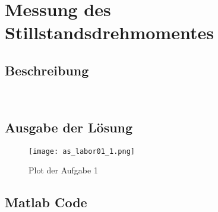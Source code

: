 \section{Messung des Stillstandsdrehmomentes}

\subsection{Beschreibung}
\lipsum[1]\\

\subsection{Ausgabe der Lösung}
\begin{figure}[htp]
 \centering
 \texttt{[image: as\_labor01\_1.png]}
 \caption{Plot der Aufgabe 1}
 \label{fig:PlotAufgabe1}
\end{figure}

\subsection{Matlab Code}

